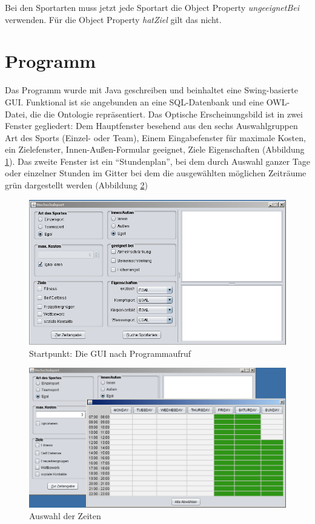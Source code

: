 Bei den Sportarten muss jetzt jede Sportart die Object Property \textit{ungeeignetBei} verwenden. F\"ur die Object Property \textit{hatZiel} gilt das nicht.




\section{Programm}
Das Programm wurde mit Java geschreiben und beinhaltet eine Swing-basierte GUI. Funktional ist sie angebunden an eine SQL-Datenbank und eine OWL-Datei, die die Ontologie repräsentiert. Das Optische Erscheinungsbild ist in zwei Fenster gegliedert: Dem Hauptfenster besehend aus den sechs Auswahlgruppen Art des Sports (Einzel- oder Team), Einem Eingabefenster für maximale Kosten, ein Zielefenster, Innen-Außen-Formular geeignet, Ziele Eigenschaften (Abbildung \ref{GUI1}). Das zweite Fenster ist ein "`Stundenplan"', bei dem durch Auswahl ganzer Tage oder einzelner Stunden im Gitter bei dem die ausgewählten möglichen Zeiträume grün dargestellt werden (Abbildung \ref{GUI2})

\begin{figure}%
\includegraphics[width=150mm]{images/gui.png}%
\caption{Startpunkt: Die GUI nach Programmaufruf}%
\label{GUI1}%
\end{figure}

\begin{figure}%
\includegraphics[width=150mm]{images/guizeit.png}%
\caption{Auswahl der Zeiten}%
\label{GUI2}%
\end{figure}

